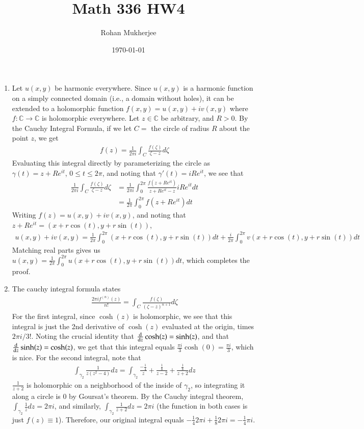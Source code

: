 \documentclass[12pt]{article}
\title{Math 336 HW4}
\date{\today}
\author{Rohan Mukherjee}
\def\mbb#1{\mathbb{#1}}
\def \C{\mbb{C}}
\theoremstyle{definition}
\theoremstyle{remark}
\begin{document}
	\maketitle
	\begin{enumerate}[leftmargin=\labelsep]
		\item Let $u(x, y)$ be harmonic everywhere. Since $u(x,y)$ is a harmonic function on a simply connected domain (i.e., a domain without holes), it can be extended to a holomorphic function $f(x,y) = u(x,y) + iv(x,y)$ where $f: \C \to \C$ is holomorphic everywhere. Let $z \in \C$ be arbitrary, and $R > 0$. By the Cauchy Integral Formula, if we let $C = $ the circle of radius $R$ about the point $z$, we get
		\begin{align*}
			f(z) = \frac{1}{2\pi i} \int_{C} \frac{f(\zeta)}{\zeta-z}d\zeta
		\end{align*}
		Evaluating this integral directly by parameterizing the circle as $\gamma(t) = z + Re^{it}$, $0 \leq t \leq 2\pi$, and noting that $\gamma'(t) = iRe^{it}$, we see that
		\begin{align*}
			\frac{1}{2\pi i} \int_{C} \frac{f(\zeta)}{\zeta-z}d\zeta &= \frac{1}{2\pi i} \int_0^{2\pi} \frac{f(z+Re^{it})}{z + Re^{it} - z}iRe^{it}dt \\
			&= \frac{1}{2\pi} \int_0^{2\pi} f(z+Re^{it})dt
		\end{align*}
		Writing $f(z) = u(x, y) + iv(x,y)$, and noting that $z + Re^{it} = (x+r\cos(t), y+r\sin(t))$,
		\begin{align*}
			u(x,y) + iv(x,y) = \frac{1}{2\pi} \int_0^{2\pi} (x+r\cos(t), y+r\sin(t))dt + \frac{i}{2\pi} \int_0^{2\pi} v(x+r\cos(t), y+r\sin(t))dt
		\end{align*}
		Matching real parts gives us $u(x,y) = \frac{1}{2\pi} \int_0^{2\pi} u(x+r\cos(t), y+r\sin(t))dt$, which completes the proof.
		
		\item The cauchy integral formula states
		\begin{align*}
			\frac{2\pi i f^{(n)}(z)}{n!} = \int_C \frac{f(\zeta)}{(\zeta - z)^{n+1}}d\zeta
		\end{align*}
		For the first integral, since $\cosh(z)$ is holomorphic, we see that this integral is just the 2nd derivative of $\cosh(z)$ evaluated at the origin, times $2 \pi i / 3!$.  Noting the crucial identity that $\dv{z} \cosh(z) = \sinh(z)$, and that $\dv{z} \sinh(z) = \cosh(z)$, we get that this integral equals $\frac{\pi i}{3} \cosh(0) = \frac{\pi i}{3}$, which is nice. For the second integral, note that 
		\begin{align*}
			\int_{\gamma_2} \frac{1}{z(z^2-4)}dz = \int_{\gamma_2} \frac {-\frac14}z + \frac{\frac18}{z-2} + \frac{\frac18}{z+2}dz
		\end{align*}
		$\frac{1}{z+2}$ is holomorphic on a neighborhood of the inside of $\gamma_2$, so integrating it along a circle is 0 by Goursat's theorem. By the Cauchy integral theorem, $\int_{\gamma_2} \frac1z dz = 2\pi i$, and similarly, $\int_{\gamma_2} \frac1{z+2} dz=2\pi i$ (the function in both cases is just $f(z) \equiv 1$). Therefore, our original integral equals $-\frac14 2\pi i + \frac18 2\pi i = -\frac14 \pi i$.
		

\end{enumerate}
\end{document}
